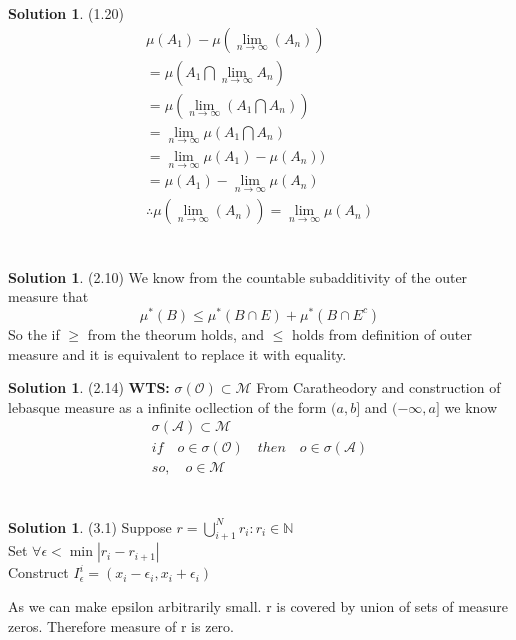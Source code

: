 \documentclass[letterpaper,12pt]{article}
\theoremstyle{definition}
\newtheorem{solution}[theorem]{Solution}
\begin{document}
\newpage
\begin{solution} (1.20) \\
\begin{gather*}
\mu(A_1) - \mu(\lim_{n \rightarrow \infty} (A_n))\\
= \mu(A_1 \bigcap \lim_{n \rightarrow \infty} A_n) \\
= \mu(\lim_{n \rightarrow \infty} (A_1 \bigcap A_n) ) \\
= \lim_{n \rightarrow \infty} \mu(A_1 \bigcap A_n) \\
= \lim_{n \rightarrow \infty} \mu(A_1) - \mu (A_n)) \\
= \mu(A_1) - \lim_{n \rightarrow \infty} \mu(A_n) \\
\therefore \mu(\lim_{n \rightarrow \infty} (A_n)) = \lim_{n \rightarrow \infty} \mu(A_n)
\end{gather*}
\end{solution}

\section{}
\begin{solution}{(2.10)}
We know from the countable subadditivity of the outer measure that
$$\mu^*(B) \leq \mu^*(B \cap E) + \mu^*(B \cap E^c) $$
So the if $\geq$ from the theorum holds, and $\leq$ holds from definition of outer measure and it is equivalent to replace it with equality.
\end{solution}

\begin{solution}{(2.14)} \textbf{WTS:} $\sigma(\mathcal{O}) \subset \mathcal{M}$
From Caratheodory and construction of lebasque measure as a infinite ocllection of the form $(a,b]$ and $(-\infty, a]$ we know
\begin{align}
\sigma(\mathcal{A})  \subset \mathcal{M} \\
if \quad o \in \sigma(\mathcal{O}) \quad then \quad o \in \sigma(\mathcal{A}) \\
so, \quad o \in \mathcal{M}
\end{align}

\end{solution}

\section{}
\begin{solution}{(3.1)}
Suppose $r = \bigcup_{i+1}^N r_i : r_i \in \mathbb{N}$ \\
Set $ \forall \epsilon < \min {|r_i - r_{i+1}| }$ \\
Construct $I_\epsilon^i = (x_i - \epsilon_i, x_i + \epsilon_i)$

As we can make epsilon arbitrarily small. r is covered by union of sets of measure zeros. Therefore measure of r is zero.
\end{solution}
\end{document}
